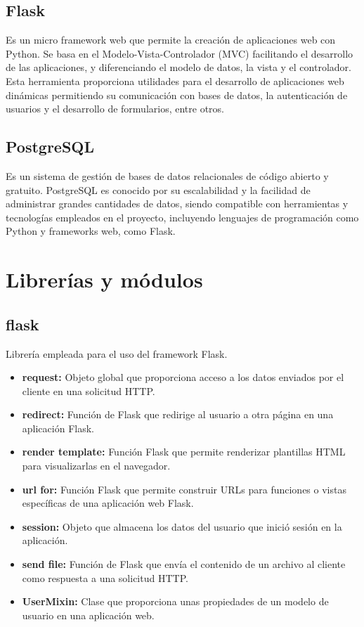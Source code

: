 \subsection{Flask}
\cite{Flask_bib} Es un micro framework web que permite la creación de aplicaciones web con Python. Se basa en el Modelo-Vista-Controlador (MVC) facilitando el desarrollo de las aplicaciones, y diferenciando el modelo de datos, la vista y el controlador.
Esta herramienta proporciona utilidades para el desarrollo de aplicaciones web dinámicas permitiendo su comunicación con bases de datos, la autenticación de usuarios y el desarrollo de formularios, entre otros.

\subsection{PostgreSQL} 
\cite{PostgreSQL_bib} Es un sistema de gestión de bases de datos relacionales de código abierto y gratuito.
PostgreSQL es conocido por su escalabilidad y la facilidad de administrar grandes cantidades de datos, siendo compatible con herramientas y tecnologías empleados en el proyecto, incluyendo lenguajes de programación como Python y frameworks web, como Flask.

\section{Librerías y módulos}
\subsection{flask}
Librería empleada para el uso del framework Flask.
\begin{itemize}
    \item \textbf{request:} \cite{request} Objeto global que proporciona acceso a los datos enviados por el cliente en una solicitud HTTP.
    \item \textbf{redirect:} \cite{redirect} Función de Flask que redirige al usuario a otra página en una aplicación Flask.
    \item \textbf{render template:}
\cite{render_template} Función Flask que permite renderizar plantillas HTML para visualizarlas en el navegador.
    \item \textbf{url for:} \cite{url} Función Flask que permite construir URLs para funciones o vistas específicas de una aplicación web Flask.
    \item \textbf{session:} \cite{session} Objeto que almacena los datos del usuario que inició sesión en la aplicación.
    \item \textbf{send file:} \cite{send_file} Función de Flask que envía el contenido de un archivo al cliente como respuesta a una solicitud HTTP.
    \item \textbf{UserMixin:} \cite{UserMixin} Clase que proporciona unas propiedades de un modelo de usuario en una aplicación web.
\end{itemize}

